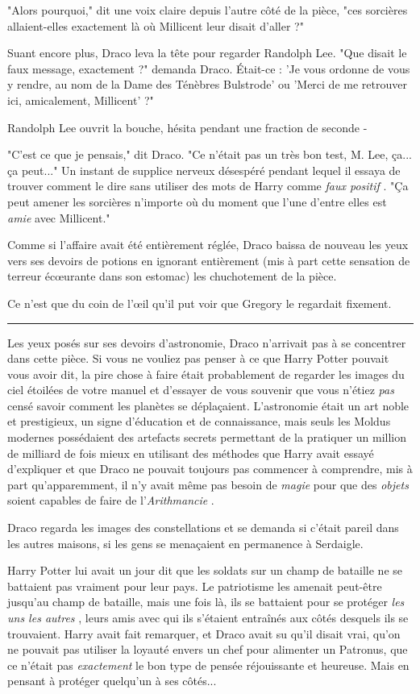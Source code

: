 "Alors pourquoi," dit une voix claire depuis l'autre côté de la pièce, "ces sorcières allaient-elles exactement là où Millicent leur disait d'aller ?"

Suant encore plus, Draco leva la tête pour regarder Randolph Lee. "Que disait le faux message, exactement ?" demanda Draco. Était-ce : 'Je vous ordonne de vous y rendre, au nom de la Dame des Ténèbres Bulstrode' ou 'Merci de me retrouver ici, amicalement, Millicent' ?"

Randolph Lee ouvrit la bouche, hésita pendant une fraction de seconde -

"C'est ce que je pensais," dit Draco. "Ce n'était pas un très bon test, M. Lee, ça... ça peut..." Un instant de supplice nerveux désespéré pendant lequel il essaya de trouver comment le dire sans utiliser des mots de Harry comme \emph{faux positif} . "Ça peut amener les sorcières n'importe où du moment que l'une d'entre elles est \emph{amie}  avec Millicent."

Comme si l'affaire avait été entièrement réglée, Draco baissa de nouveau les yeux vers ses devoirs de potions en ignorant entièrement (mis à part cette sensation de terreur écœurante dans son estomac) les chuchotement de la pièce.

Ce n'est que du coin de l'œil qu'il put voir que Gregory le regardait fixement.
\par\noindent\rule{\textwidth}{0.4pt}
Les yeux posés sur ses devoirs d'astronomie, Draco n'arrivait pas à se concentrer dans cette pièce. Si vous ne vouliez pas penser à ce que Harry Potter pouvait vous avoir dit, la pire chose à faire était probablement de regarder les images du ciel étoilées de votre manuel et d'essayer de vous souvenir que vous n'étiez \emph{pas}  censé savoir comment les planètes se déplaçaient. L'astronomie était un art noble et prestigieux, un signe d'éducation et de connaissance, mais seuls les Moldus modernes possédaient des artefacts secrets permettant de la pratiquer un million de milliard de fois mieux en utilisant des méthodes que Harry avait essayé d'expliquer et que Draco ne pouvait toujours pas commencer à comprendre, mis à part qu'apparemment, il n'y avait même pas besoin de \emph{magie}  pour que des \emph{objets}  soient capables de faire de l'\emph{Arithmancie} .

Draco regarda les images des constellations et se demanda si c'était pareil dans les autres maisons, si les gens se menaçaient en permanence à Serdaigle.

Harry Potter lui avait un jour dit que les soldats sur un champ de bataille ne se battaient pas vraiment pour leur pays. Le patriotisme les amenait peut-être jusqu'au champ de bataille, mais une fois là, ils se battaient pour se protéger \emph{les uns les autres} , leurs amis avec qui ils s'étaient entraînés aux côtés desquels ils se trouvaient. Harry avait fait remarquer, et Draco avait su qu'il disait vrai, qu'on ne pouvait pas utiliser la loyauté envers un chef pour alimenter un Patronus, que ce n'était pas \emph{exactement}  le bon type de pensée réjouissante et heureuse. Mais en pensant à protéger quelqu'un à ses côtés...

